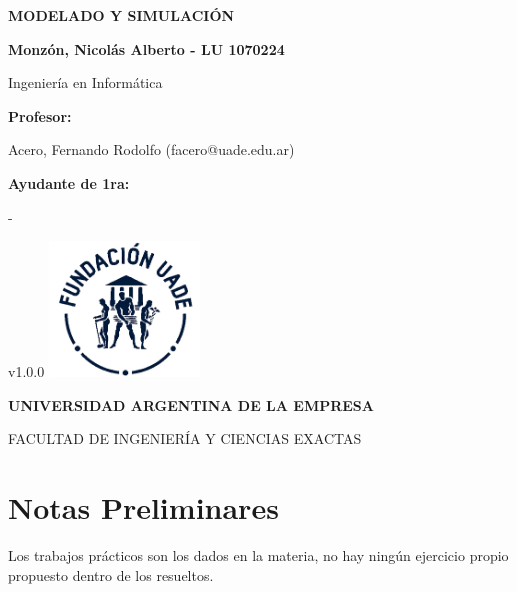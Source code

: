 \documentclass[a4paper, 12pt, oneside, titlepage, openany]{book}
\begin{document}

\begin{titlepage}

	\centering
	{\textbf{\fontsize{16}{17}\selectfont MODELADO Y SIMULACI\'ON} \par}
	\vspace{1cm}
	{\textbf{\fontsize{16}{17}\selectfont Monz\'on, Nicol\'as Alberto - LU 1070224} \par}
	\vspace{1.5cm}
	{\fontsize{16}{17}\selectfont Ingenier\'ia en Inform\'atica \par}
	\vspace{1cm}
	{\textbf{\fontsize{14}{14}\selectfont Profesor:} \par}
	{\fontsize{14}{14}\selectfont Acero, Fernando Rodolfo (facero@uade.edu.ar)
	\par}
	\vspace{1cm}
	{\textbf{\fontsize{14}{14}\selectfont Ayudante de 1ra:} \par}
	{\fontsize{14}{14}\selectfont -
	\par}
	\vfill
		v1.0.0
	\vfill
	\includegraphics[width=0.30\textwidth]{./images/UADE}\par \vspace{1cm}
	{\textbf{\fontsize{14}{14}\selectfont UNIVERSIDAD ARGENTINA DE LA EMPRESA} \par}
	{\fontsize{14}{14}\selectfont FACULTAD DE INGENIER\'IA Y CIENCIAS EXACTAS \par}

\end{titlepage}

\chapter*{Notas Preliminares}
Los trabajos pr\'acticos son los dados en la materia, no hay ning\'un ejercicio propio propuesto dentro de los resueltos.
\end{document}
